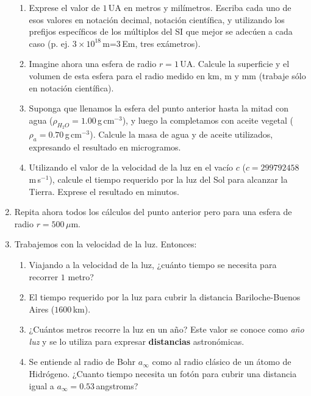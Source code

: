 \documentclass[a4paper,12pt]{article}
\begin{document}
\begin{enumerate}
\begin{enumerate}
\item Exprese el valor de $1$\,UA en metros y
milímetros. Escriba cada uno de esos valores en notación decimal, notación
científica, y utilizando los prefijos específicos de los múltiplos del SI que
mejor se adecúen a cada caso (p. ej. $3\times10^{18}$\,m=3\,Em, tres
exámetros).  \item Imagine ahora una esfera de radio $r=1$\,UA. Calcule la
superficie y el volumen de esta esfera para el radio medido en km, m y mm
(trabaje sólo en notación científica).
\item Suponga que llenamos la esfera del punto anterior hasta la mitad con agua
($\rho_{H_2O} = 1.00$\,g\,cm$^{-3}$), y luego la completamos con aceite vegetal
($\rho_{a} = 0.70$\,g\,cm$^{-3}$). Calcule la masa de agua y de aceite
utilizados, expresando el resultado en microgramos.
\item Utilizando el valor de la velocidad de la luz en el vacío $c$ ($c=299 792
458$\,m\,s$^{-1}$), calcule el tiempo requerido por la luz del Sol para
alcanzar la Tierra. Exprese el resultado en minutos. 
\end{enumerate}

\item Repita ahora todos los cálculos del punto anterior pero para una esfera
de radio $r=500$\,$\mu$m. 

\item Trabajemos con la velocidad de la luz. Entonces:

\begin{enumerate}
\item Viajando a la velocidad de la luz, ¿cuánto tiempo se necesita para
recorrer $1$ metro? 
\item El tiempo requerido por la luz para cubrir la distancia Bariloche-Buenos
Aires ($1600$\,km).
\item ¿Cuántos metros recorre la luz en un año? Este valor se conoce como
{\emph{año luz}} y se lo utiliza para expresar {\bf{distancias}} astronómicas.
\item Se entiende al radio de Bohr $a_\infty$ como al radio clásico de un átomo
de Hidrógeno. ¿Cuanto tiempo necesita un fotón para cubrir una distancia igual
a $a_\infty=0.53$\,angstroms? 
\end{enumerate}
\end{enumerate}
\end{document}
